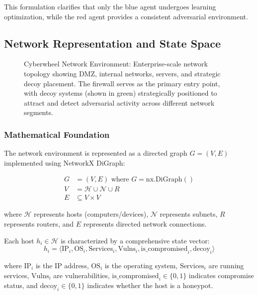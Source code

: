 \documentclass[12pt,twoside]{article}
\theoremstyle{definition}
\theoremstyle{plain}
\begin{document}
This formulation clarifies that only the blue agent undergoes learning optimization, while the red agent provides a consistent adversarial environment.

\subsection{Network Representation and State Space}

\begin{figure}[H]
\centering
\caption{Cyberwheel Network Environment: Enterprise-scale network topology showing DMZ, internal networks, servers, and strategic decoy placement. The firewall serves as the primary entry point, with decoy systems (shown in green) strategically positioned to attract and detect adversarial activity across different network segments.}
\label{fig:network_environment}
\end{figure}
\subsubsection{Mathematical Foundation}
The network environment is represented as a directed graph $G = (V, E)$ implemented using NetworkX DiGraph:

\begin{align}
G &= (V, E) \text{ where } G = \text{nx.DiGraph}() \\
V &= \mathcal{H} \cup \mathcal{N} \cup R \\
E &\subseteq V \times V
\end{align}

where $\mathcal{H}$ represents hosts (computers/devices), $\mathcal{N}$ represents subnets, $R$ represents routers, and $E$ represents directed network connections.

Each host $h_i \in \mathcal{H}$ is characterized by a comprehensive state vector:
\begin{equation}
h_i = \langle \text{IP}_i, \text{OS}_i, \text{Services}_i, \text{Vulns}_i, \text{is\_compromised}_i, \text{decoy}_i \rangle
\end{equation}

where $\text{IP}_i$ is the IP address, $\text{OS}_i$ is the operating system, $\text{Services}_i$ are running services, $\text{Vulns}_i$ are vulnerabilities, $\text{is\_compromised}_i \in \{0,1\}$ indicates compromise status, and $\text{decoy}_i \in \{0,1\}$ indicates whether the host is a honeypot.
\end{document}
